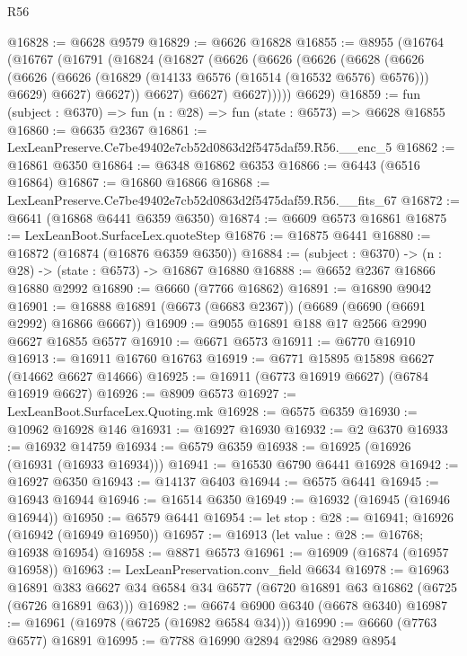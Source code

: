 \begin{lexlean}{R56}
\begin{coremodule}
@16828 := @6628 @9579
@16829 := @6626 @16828
@16855 := @8955
    (@16764
      (@16767
        (@16791
          (@16824
            (@16827
              (@6626
                (@6626
                  (@6626
                    (@6628
                      (@6626
                        (@6626
                          (@6626 (@16829 (@14133 @6576 (@16514 (@16532 @6576) @6576))) @6629)
                          @6627)
                        @6627))
                    @6627)
                  @6627)
                @6627)))))
      @6629)
@16859 := fun (subject : @6370) => fun (n : @28) => fun (state : @6573) => @6628 @16855
@16860 := @6635 @2367
@16861 := LexLeanPreserve.Ce7be49402e7cb52d0863d2f5475daf59.R56.__enc_5
@16862 := @16861 @6350
@16864 := @6348 @16862 @6353
@16866 := @6443 (@6516 @16864)
@16867 := @16860 @16866
@16868 := LexLeanPreserve.Ce7be49402e7cb52d0863d2f5475daf59.R56.__fits_67
@16872 := @6641 (@16868 @6441 @6359 @6350)
@16874 := @6609 @6573 @16861
@16875 := LexLeanBoot.SurfaceLex.quoteStep
@16876 := @16875 @6441
@16880 := @16872 (@16874 (@16876 @6359 @6350))
@16884 := (subject : @6370) -> (n : @28) -> (state : @6573) -> @16867 @16880
@16888 := @6652 @2367 @16866 @16880 @2992
@16890 := @6660 (@7766 @16862)
@16891 := @16890 @9042
@16901 := @16888 @16891 (@6673 (@6683 @2367)) (@6689 (@6690 (@6691 @2992) @16866 @6667))
@16909 := @9055 @16891 @188 @17 @2566 @2990 @6627 @16855 @6577
@16910 := @6671 @6573
@16911 := @6770 @16910
@16913 := @16911 @16760 @16763
@16919 := @6771 @15895 @15898 @6627 (@14662 @6627 @14666)
@16925 := @16911 (@6773 @16919 @6627) (@6784 @16919 @6627)
@16926 := @8909 @6573
@16927 := LexLeanBoot.SurfaceLex.Quoting.mk
@16928 := @6575 @6359
@16930 := @10962 @16928 @146
@16931 := @16927 @16930
@16932 := @2 @6370
@16933 := @16932 @14759
@16934 := @6579 @6359
@16938 := @16925 (@16926 (@16931 (@16933 @16934)))
@16941 := @16530 @6790 @6441 @16928
@16942 := @16927 @6350
@16943 := @14137 @6403
@16944 := @6575 @6441
@16945 := @16943 @16944
@16946 := @16514 @6350
@16949 := @16932 (@16945 (@16946 @16944))
@16950 := @6579 @6441
@16954 := let stop : @28 := @16941; @16926 (@16942 (@16949 @16950))
@16957 := @16913 (let value : @28 := @16768; @16938 @16954)
@16958 := @8871 @6573
@16961 := @16909 (@16874 (@16957 @16958))
@16963 := LexLeanPreservation.conv_field @6634
@16978 := @16963
    @16891
    @383
    @6627
    @34
    @6584
    @34
    @6577
    (@6720 @16891 @63 @16862 (@6725 (@6726 @16891 @63)))
@16982 := @6674 @6900 @6340 (@6678 @6340)
@16987 := @16961 (@16978 (@6725 (@16982 @6584 @34)))
@16990 := @6660 (@7763 @6577) @16891
@16995 := @7788 @16990 @2894 @2986 @2989 @8954

\end{coremodule}
\end{lexlean}
